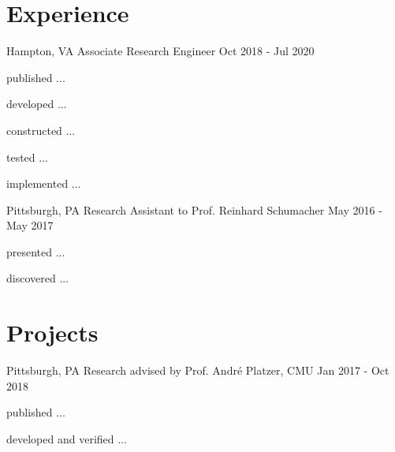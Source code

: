 \documentclass{simple_resume}[2020/07/29]
\begin{document}
\section{Experience}
                {Hampton, VA} %
                {Associate Research Engineer} %
                {Oct 2018 - Jul 2020} %
{\begin{items}
    \item {published ...}
    \item {developed ...}
    \item {constructed ...}
    \item {tested ...}
\end{items}}
\vspace{-1ex}
{\begin{items}
    \item {implemented ...}
\end{items}}

                {Pittsburgh, PA} %
                {Research Assistant to Prof. Reinhard Schumacher} %
                {May 2016 - May 2017} %
{\begin{items}
    \item {presented ...}
    \item {discovered ...}
    \item {}
\end{items}}

\section{Projects}
                {Pittsburgh, PA} %
                {Research advised by Prof. André Platzer, CMU} %
                {Jan 2017 - Oct 2018} %
{\begin{items}
    \item {published ...}
    \item {developed and verified ...}
\end{items}}
\end{document}
